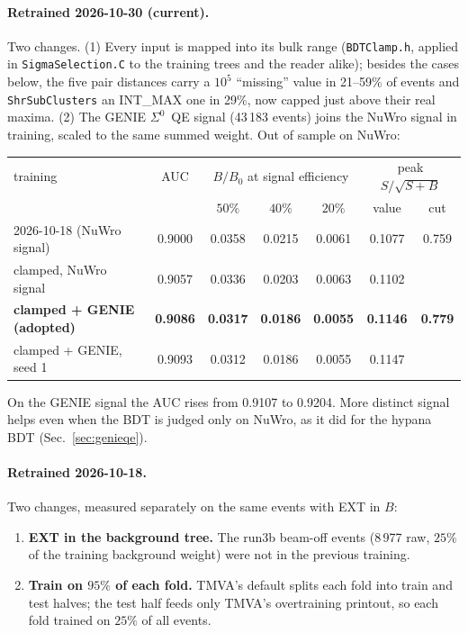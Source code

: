 \documentclass[11pt,a4paper]{article}
\newcommand{\Szero}{\ensuremath{\Sigma^{0}}}
\begin{document}
\paragraph{Retrained 2026-10-30 (current).} Two changes. (1) Every input is mapped into
its bulk range (\texttt{BDTClamp.h}, applied in \texttt{SigmaSelection.C} to the training
trees and the reader alike); besides the cases below, the five pair distances carry a
$10^5$ ``missing'' value in 21--59\% of events and \texttt{ShrSubClusters} an INT\_MAX
one in 29\%, now capped just above their real maxima. (2) The GENIE \Szero\ QE signal
(43\,183 events) joins the NuWro signal in training, scaled to the same summed weight.
Out of sample on NuWro:

\begin{center}
\small
\begin{tabular}{lcccccc}
\toprule
training & AUC & \multicolumn{3}{c}{$B/B_0$ at signal efficiency} & \multicolumn{2}{c}{peak $S/\sqrt{S+B}$} \\
 & & $50\%$ & $40\%$ & $20\%$ & value & cut \\
\midrule
2026-10-18 (NuWro signal)         & 0.9000 & 0.0358 & 0.0215 & 0.0061 & 0.1077 & 0.759 \\
clamped, NuWro signal             & 0.9057 & 0.0336 & 0.0203 & 0.0063 & 0.1102 & \\
\textbf{clamped + GENIE (adopted)} & \textbf{0.9086} & \textbf{0.0317} & \textbf{0.0186} & \textbf{0.0055} & \textbf{0.1146} & \textbf{0.779} \\
clamped + GENIE, seed 1           & 0.9093 & 0.0312 & 0.0186 & 0.0055 & 0.1147 & \\
\bottomrule
\end{tabular}
\end{center}

\noindent On the GENIE signal the AUC rises from 0.9107 to 0.9204. More distinct signal
helps even when the BDT is judged only on NuWro, as it did for the hypana BDT
(Sec.~\ref{sec:genieqe}).

\paragraph{Retrained 2026-10-18.} Two changes, measured separately on the same
events with EXT in $B$:
\begin{enumerate}
  \item \textbf{EXT in the background tree.} The run3b beam-off events (8\,977 raw,
        $25\%$ of the training background weight) were not in the previous training.
  \item \textbf{Train on $95\%$ of each fold.} TMVA's default splits each fold into
        train and test halves; the test half feeds only TMVA's overtraining printout,
        so each fold trained on $25\%$ of all events.
\end{enumerate}
\end{document}
